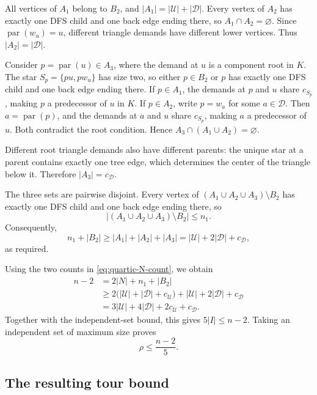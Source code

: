 \documentclass[11pt]{amsart}
\newcommand{\1}{\mathbbm{1}}
\begin{document}
All vertices of $A_1$ belong to $B_2$, and
$|A_1|=|\mathcal U|+|\mathcal D|$.
Every vertex of $A_2$ has exactly one DFS child and one
back edge ending there, so $A_1\cap A_2=\varnothing$.
Since $\operatorname{par}(w_u)=u$, different triangle
demands have different lower vertices. Thus $|A_2|=|\mathcal D|$.

Consider $p=\operatorname{par}(u)\in A_3$, where the
demand at $u$ is a component root in $K$.
The star $S_p=\{pu,pw_u\}$ has size two, so either
$p\in B_2$ or $p$ has exactly one DFS child and one
back edge ending there.
If $p\in A_1$, the demands at $p$ and $u$ share
$c_{S_p}$, making $p$ a predecessor of $u$ in $K$.
If $p\in A_2$, write $p=w_a$ for some $a\in\mathcal D$.
Then $a=\operatorname{par}(p)$, and the demands at $a$
and $u$ share $c_{S_p}$, making $a$ a predecessor of $u$.
Both contradict the root condition. Hence
$A_3\cap(A_1\cup A_2)=\varnothing$.

Different root triangle demands also have different
parents: the unique star at a parent contains exactly
one tree edge, which determines the center of the
triangle below it. Therefore $|A_3|=c_{\mathcal D}$.

The three sets are pairwise disjoint. Every vertex of
$(A_1\cup A_2\cup A_3)\setminus B_2$ has exactly one DFS
child and one back edge ending there, so
\[
 |(A_1\cup A_2\cup A_3)\setminus B_2|\le n_1.
\]
Consequently,
\[
 n_1+|B_2|
 \ge |A_1|+|A_2|+|A_3|
 =|\mathcal U|+2|\mathcal D|+c_{\mathcal D},
\]
as required.

Using the two counts in \eqref{eq:quartic-N-count},
we obtain
\begin{equation}
\label{eq:quartic-forest-budget}
 \begin{aligned}
 n-2
 &=2|N|+n_1+|B_2|\\
 &\ge
 2\bigl(|\mathcal U|+|\mathcal D|+c_{\mathcal U}\bigr)
 +|\mathcal U|+2|\mathcal D|+c_{\mathcal D}\\
 &=3|\mathcal U|+4|\mathcal D|
   +2c_{\mathcal U}+c_{\mathcal D}.
 \end{aligned}
\end{equation}
Together with the independent-set bound, this gives
$5|I|\le n-2$. Taking an independent set of maximum
size proves
\begin{equation}
\label{eq:quartic-repair-budget}
 \rho\le\frac{n-2}{5}.
\end{equation}

\subsection{The resulting tour bound}
\end{document}
